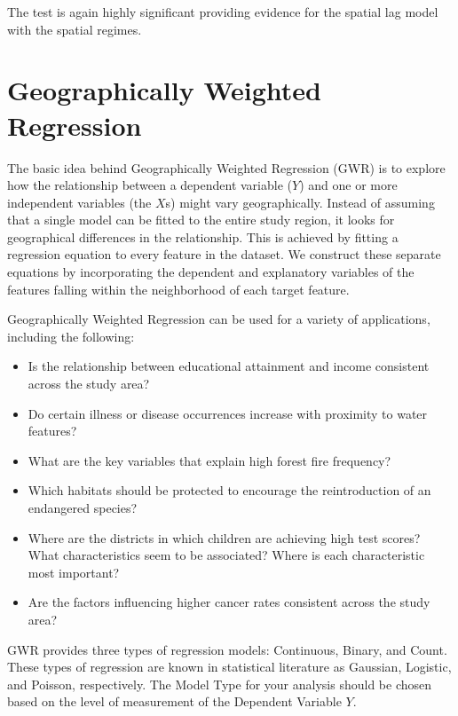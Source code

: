 \documentclass[
  krantz2]{krantz}
\providecommand{\tightlist}{%
  \setlength{\itemsep}{0pt}\setlength{\parskip}{0pt}}
\begin{document}
The test is again highly significant providing evidence for the spatial lag model with the spatial regimes.

\hypertarget{geographically-weighted-regression}{%
\section{Geographically Weighted Regression}\label{geographically-weighted-regression}}

The basic idea behind Geographically Weighted Regression (GWR) is to explore how the relationship between a dependent variable (\(Y\)) and one or more independent variables (the \(X\)s) might vary geographically. Instead of assuming that a single model can be fitted to the entire study region, it looks for geographical differences in the relationship. This is achieved by fitting a regression equation to every feature in the dataset. We construct these separate equations by incorporating the dependent and explanatory variables of the features falling within the neighborhood of each target feature.

Geographically Weighted Regression can be used for a variety of applications, including the following:

\begin{itemize}
\tightlist
\item
  Is the relationship between educational attainment and income consistent across the study area?
\item
  Do certain illness or disease occurrences increase with proximity to water features?
\item
  What are the key variables that explain high forest fire frequency?
\item
  Which habitats should be protected to encourage the reintroduction of an endangered species?
\item
  Where are the districts in which children are achieving high test scores? What characteristics seem to be associated? Where is each characteristic most important?
\item
  Are the factors influencing higher cancer rates consistent across the study area?
\end{itemize}

GWR provides three types of regression models: Continuous, Binary, and Count. These types of regression are known in statistical literature as Gaussian, Logistic, and Poisson, respectively. The Model Type for your analysis should be chosen based on the level of measurement of the Dependent Variable \(Y\).
\end{document}
